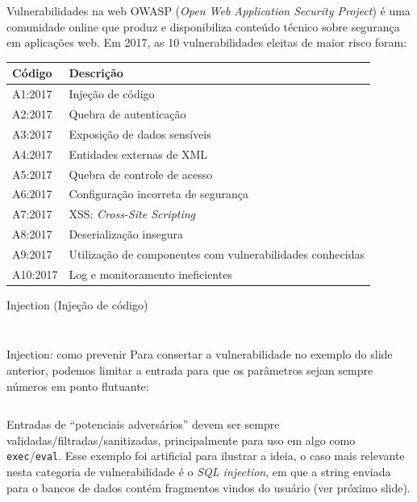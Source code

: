 \documentclass[utf8]{beamer}
\begin{document}
\begin{frame}{Vulnerabilidades na web}
  OWASP (\emph{Open Web Application Security Project})
  é uma comunidade online que produz e disponibiliza
  conteúdo técnico sobre segurança em aplicações web.
  \vfill
  Em 2017, as 10 vulnerabilidades eleitas de maior risco foram:
  \vfill
  \begin{tabu}{lX}
    \hline
    Código   & Descrição \\
    \hline
    A1:2017  & Injeção de código \\
    A2:2017  & Quebra de autenticação \\
    A3:2017  & Exposição de dados sensíveis \\
    A4:2017  & Entidades externas de XML \\
    A5:2017  & Quebra de controle de acesso \\
    A6:2017  & Configuração incorreta de segurança \\
    A7:2017  & XSS: \emph{Cross-Site Scripting} \\
    A8:2017  & Deserialização insegura \\
    A9:2017  & Utilização de componentes
               com vulnerabilidades conhecidas \\
    A10:2017 & Log e monitoramento ineficientes \\
    \hline
  \end{tabu}
\end{frame}


\begin{frame}{Injection (Injeção de código)}
  \inputminted{python}{calc.py}%
  \vfill%
  \inputminted{shell}{calc_run.sh}
\end{frame}


\begin{frame}{Injection: como prevenir}
  Para consertar a vulnerabilidade no exemplo do slide anterior,
  podemos limitar a entrada
  para que os parâmetros sejam sempre números em ponto flutuante:
  \vfill
  \inputminted{python}{calc_fix.py}%
  \vfill%
  Entradas de ``potenciais adversários''
  devem ser sempre validadas/filtradas/sanitizadas,
  principalmente para uso em algo como \texttt{exec}/\texttt{eval}.
  Esse exemplo foi artificial para ilustrar a ideia,
  o caso mais relevante nesta categoria de vulnerabilidade
  é o \emph{SQL injection},
  em que a string enviada para o bancos de dados
  contém fragmentos vindos do usuário
  (ver próximo slide).
\end{frame}
\end{document}
